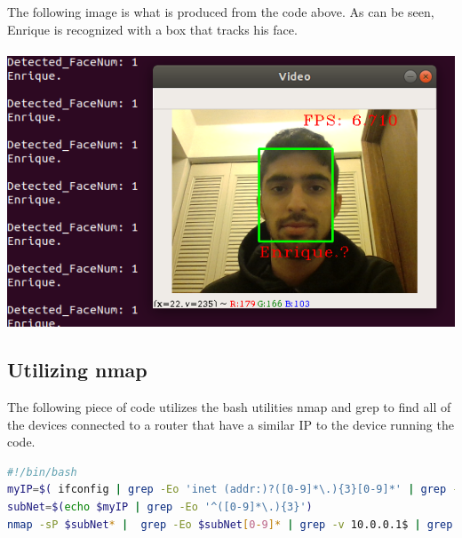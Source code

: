 \documentclass[onecolumn, draftclsnofoot,10pt, compsoc]{IEEEtran}
\begin{document}
The following image is what is produced from the code above. As can be seen, Enrique is recognized with a box that tracks his face. \\ \\

\includegraphics[width=\textwidth]{recognition.png}




\subsection{Utilizing nmap}
The following piece of code utilizes the bash utilities nmap and grep to find all of the devices connected to a router that have a similar IP to the device running the code.
\begin{lstlisting}[language=bash,caption={Utilization of nmap, grep, and regexp}, basicstyle=\scriptsize]
#!/bin/bash
myIP=$( ifconfig | grep -Eo 'inet (addr:)?([0-9]*\.){3}[0-9]*' | grep -Eo '([0-9]*\.){3}[0-9]*' | grep -v '127.0.0.1' )
subNet=$(echo $myIP | grep -Eo '^([0-9]*\.){3}')
nmap -sP $subNet* |  grep -Eo $subNet[0-9]* | grep -v 10.0.0.1$ | grep -v $myIP
\end{lstlisting}
\end{document}
